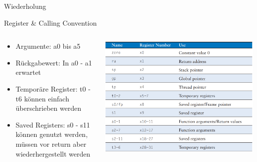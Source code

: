 \documentclass[
  german,            %
  aspectratio=169,    %
]{tumbeamer}
\begin{document}
\begin{frame}[c]{}{}
  \begin{center}
    \LARGE  Wiederholung
  \end{center}
\end{frame}

\begin{frame}[c]{Register \& Calling Convention}{}
  \begin{columns}[c]
    \begin{column}{0.5\textwidth}
      \begin{itemize}
        \item Argumente: a0 bis a5
        \item Rückgabewert: In a0 - a1 erwartet
        \item Temporäre Register: t0 - t6 können einfach überschrieben werden
        \item Saved Registers: s0 - s11 können genutzt werden, müssen vor return aber wiederhergestellt werden
      \end{itemize}
    \end{column}
    \begin{column}{0.5\textwidth}
      \includegraphics[width=\linewidth]{riscv_registers.png}
    \end{column}
  \end{columns}
\end{frame}
\end{document}

